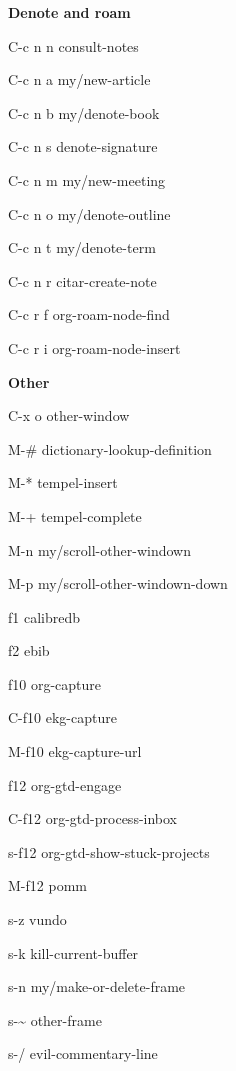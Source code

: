 \documentclass[10pt]{article}
\renewcommand\subsection[1]{\smallskip\par\textbf{\color{heading}#1}}
\begin{document}
\begin{multicols}{4}
  \subsection{Denote and roam}
  \begin{keylist}
    \item[C-c n n] consult-notes
    \item[C-c n a] my/new-article
    \item[C-c n b] my/denote-book
    \item[C-c n s] denote-signature
    \item[C-c n m] my/new-meeting
    \item[C-c n o] my/denote-outline
    \item[C-c n t] my/denote-term
    \item[C-c n r] citar-create-note
    \item[C-c r f] org-roam-node-find
    \item[C-c r i] org-roam-node-insert
  \end{keylist}

  \subsection{Other}
  \begin{keylist}
    \item[C-x o] other-window
    \item[M-\#] dictionary-lookup-definition
    \item[M-*] tempel-insert
    \item[M-+] tempel-complete
    \item[M-n] my/scroll-other-windown
    \item[M-p] my/scroll-other-windown-down

    \item[f1] calibredb
    \item[f2] ebib

    \item[f10] org-capture
    \item[C-f10] ekg-capture
    \item[M-f10] ekg-capture-url

    \item[f12] org-gtd-engage
    \item[C-f12] org-gtd-process-inbox
    \item[s-f12] org-gtd-show-stuck-projects
    \item[M-f12] pomm

    \item[s-z] vundo
    \item[s-k] kill-current-buffer
    \item[s-n] my/make-or-delete-frame
    \item[s-\~] other-frame
    \item[s-/] evil-commentary-line


\end{keylist}
\end{multicols}
\end{document}
